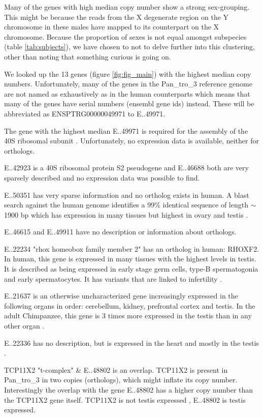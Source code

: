 Many of the genes with high median copy number show a strong sex-grouping. This might be because the reads from the X degenerate region on the Y chromosome in these males have mapped to its counterpart on the X chromosome. Because the proportion of sexes is not equal amongst subspecies (table \ref{tab:subjects}), we have chosen to not to delve further into this clustering, other than noting that something curious is going on. 

We looked up the 13 genes (figure \ref{fig:fig_main}) with the highest median copy numbers. Unfortunately, many of the genes in the Pan\_tro\_3 reference genome are not named as exhaustively as in the human counterparts which means that many of the genes have serial numbers (ensembl gene ids) instead. These will be abbreviated as ENSPTRG00000049971 to E..49971. 

The gene with the highest median \noindent E..49971 is required for the assembly of the 40S ribosomal subunit \cite{ensembl}. Unfortunately, no expression data is available, neither for orthologs.

E..42923 is a 40S ribosomal protein S2 pseudogene and E..46688 both are very sparsely described \cite{ensembl} and no expression data was possible to find.

E..50351 has very sparse information and no ortholog exists in human. A blast search against the human genome identifies a 99\% identical sequence of length $\sim$ 1900 bp which has expression in many tissues but highest in ovary and testis \cite{ensembl}. 

E..46615 and E..49911 have no description or information about orthologs.


E..22234 "rhox homeobox family member 2" has an ortholog in human: RHOXF2. In human, this gene is expressed in many tissues with the highest levels in testis. It is described as being expressed in early stage germ cells, type-B spermatogonia and early spermatocytes. It has variants that are linked to infertility \cite{10.1093/hmg/ddw313}.

E..21637 is an otherwise uncharacterized gene increasingly expressed in the following organs in order: cerebellum, kidney, prefrontal cortex and testis. In the adult Chimpanzee, this gene is 3 times more expressed in the testis than in any other organ \cite{bgee_}.


E..22336 has no description, but is expressed in the heart and mostly in the testis \cite{bgee_}.



TCP11X2 "t-complex" & E..48802 is an overlap. TCP11X2 is present in Pan\_tro\_3 in two copies (orthologs), which might inflate its copy number. Interestingly the overlap with the gene E..48802 has a higher copy number than the TCP11X2 gene itself. TCP11X2 is not testis expressed \cite{ensembl}, E..48802 is testis expressed.


